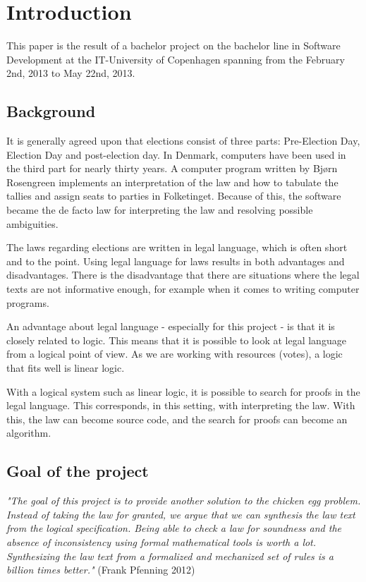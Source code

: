 \chapter{Introduction}
\label{01}

This paper is the result of a bachelor project on the bachelor line in Software Development at the IT-University of Copenhagen spanning from the February 2nd, 2013 to May 22nd, 2013.

\section{Background}
\label{01_01}

It is generally agreed upon that elections consist of three parts: Pre-Election Day, Election Day and post-election day. In Denmark, computers have been used in the third part for nearly thirty years. A computer program written by Bjørn Rosengreen implements an interpretation of the law and how to tabulate the tallies and assign seats to parties in Folketinget. Because of this, the software became the de facto law for interpreting the law and resolving possible ambiguities.

The laws regarding elections are written in legal language, which is often short and to the point. Using legal language for laws results in both advantages and disadvantages. There is the disadvantage that there are situations where the legal texts are not informative enough, for example when it comes to writing computer programs.

An advantage about legal language - especially for this project - is that it is closely related to logic. This means that it is possible to look at legal language from a logical point of view. As we are working with resources (votes), a logic that fits well is linear logic.

With a logical system such as linear logic, it is possible to search for proofs in the legal language. This corresponds, in this setting, with interpreting the law. With this, the law can become source code, and the search for proofs can become an algorithm.

\section{Goal of the project}
\label{01_02}

\begin{texto2}
	\textit{"The goal of this project is to provide another solution to the chicken egg problem. Instead of taking the law for granted, we argue that we can synthesis the law text from the logical specification. Being able to check a law for soundness and the absence of inconsistency using formal mathematical tools is worth a lot. Synthesizing the law text from a formalized and mechanized set of rules is a billion times better."} (Frank Pfenning 2012)
\end{texto2}

